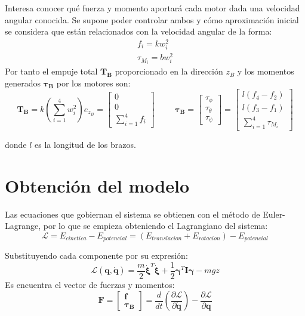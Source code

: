 \documentclass[twoside,11pt]{book}
\begin{document}
Interesa conocer qué fuerza y momento aportará cada motor dada una velocidad angular conocida. Se supone poder controlar ambos y cómo aproximación inicial se considera que están relacionados con la velocidad angular de la forma:
\begin{equation}
\begin{array}{l}
f_i=kw^2_i \\ 
\tau_{M_i}=bw^2_i
\end{array}
\end{equation}
Por tanto el empuje total $\pmb{T_B}$ proporcionado en la dirección $z_B$ y los momentos generados $\pmb{\tau_B}$ por los motores son:
\begin{equation}
\pmb{T_B}=k\left(\sum_{i=1}^{4}w^2_i \right)e_{z_B}=\left[ \begin{array}{c}
0 \\
0 \\
\displaystyle\sum_{i=1}^{4}f_i
\end{array} \right] 
\hspace{1cm} \pmb{\tau_B}=\left[ \begin{array}{c}
\tau_\phi \\
\tau_\theta \\
\tau_\psi
\end{array} \right] = \left[ \begin{array}{c}
l(f_4 - f_2) \\
l(f_3 - f_1) \\
\displaystyle\sum_{i=1}^{4}\tau_{M_i}
\end{array} \right]
\end{equation}

donde $l$ es la longitud de los brazos.

\section{Obtención del modelo}
Las ecuaciones que gobiernan el sistema se obtienen con el método de Euler-Lagrange, por lo que se empieza obteniendo el Lagrangiano del sistema:
\begin{equation}
\mathcal{L}=E_{cinetica} - E_{potencial} = (E_{translacion}+E_{rotacion})-E_{potencial}
\end{equation}

Substituyendo cada componente por su expresión:
\begin{equation}
\mathcal{L}(\pmb{q},\pmb{\dot{q}})=\frac{m}{2} \pmb{\dot{\xi}}^T \pmb{\dot{\xi}} + \frac{1}{2}\pmb{\gamma}^{T}\pmb{I}\pmb{\gamma} - mgz
\end{equation}
Es encuentra el vector de fuerzas y  momentos:
\begin{equation}
\pmb{F}=\left[ \begin{array}{c}
\pmb{f} \\
\pmb{\tau_B}
\end{array} \right] = \frac{d}{dt}\left(\frac{\partial \mathcal{L}}{\partial \pmb{\dot{q}}}\right)-\frac{\partial\mathcal{L}}{\partial \pmb{q}}
\end{equation}
\end{document}
